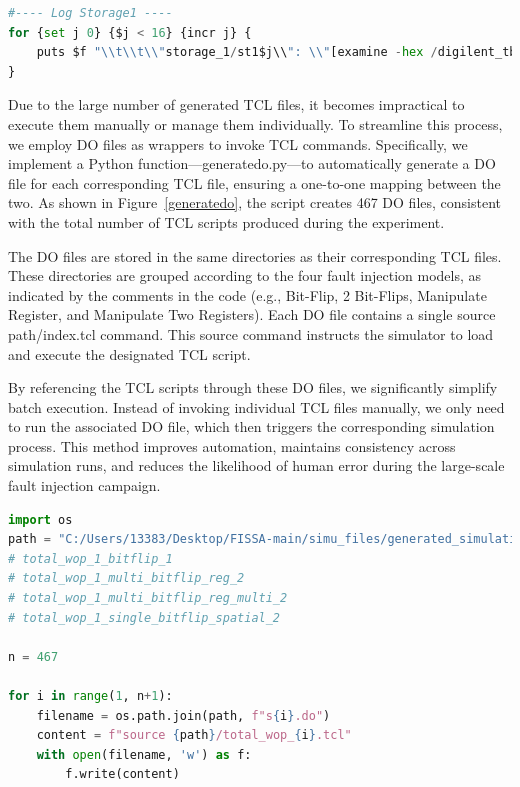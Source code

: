 \begin{lstlisting}[language=python, caption={code\_execution.py}, label={code}]
#---- Log Storage1 ----
for {set j 0} {$j < 16} {incr j} {
    puts $f "\\t\\t\\"storage_1/st1$j\\": \\"[examine -hex /digilent_tb/UUT/storage_1\\[{$j}\\]]\\","
}
\end{lstlisting}

Due to the large number of generated TCL files, it becomes impractical to execute them manually or manage them individually. To streamline this process, we employ DO files as wrappers to invoke TCL commands. Specifically, we implement a Python function—generatedo.py—to automatically generate a DO file for each corresponding TCL file, ensuring a one-to-one mapping between the two. As shown in Figure~\ref{generatedo}, the script creates 467 DO files, consistent with the total number of TCL scripts produced during the experiment.

The DO files are stored in the same directories as their corresponding TCL files. These directories are grouped according to the four fault injection models, as indicated by the comments in the code (e.g., Bit-Flip, 2 Bit-Flips, Manipulate Register, and Manipulate Two Registers). Each DO file contains a single source path/index.tcl command. This source command instructs the simulator to load and execute the designated TCL script.

By referencing the TCL scripts through these DO files, we significantly simplify batch execution. Instead of invoking individual TCL files manually, we only need to run the associated DO file, which then triggers the corresponding simulation process. This method improves automation, maintains consistency across simulation runs, and reduces the likelihood of human error during the large-scale fault injection campaign.

\begin{lstlisting}[language=python, caption={generatedo.py}, label={generatedo}]
import os
path = "C:/Users/13383/Desktop/FISSA-main/simu_files/generated_simulations/total/total_wop_1_single_bitflip_spatial_2"
# total_wop_1_bitflip_1
# total_wop_1_multi_bitflip_reg_2
# total_wop_1_multi_bitflip_reg_multi_2
# total_wop_1_single_bitflip_spatial_2

n = 467  

for i in range(1, n+1):
    filename = os.path.join(path, f"s{i}.do")
    content = f"source {path}/total_wop_{i}.tcl"
    with open(filename, 'w') as f:
        f.write(content)
\end{lstlisting}

